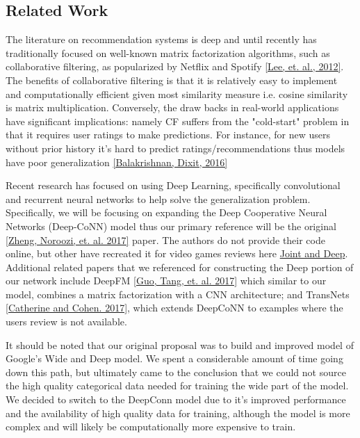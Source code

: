 \documentclass[10pt,twocolumn,letterpaper]{article}
\begin{document}

\subsection{Related Work}
\par The literature on recommendation systems is deep and until recently has traditionally focused on well-known matrix factorization algorithms, such as collaborative filtering, as popularized by Netflix and Spotify \href{https://arxiv.org/pdf/1205.3193.pdf}{[Lee, et. al., 2012]}. The benefits of collaborative filtering is that it is relatively easy to implement and computationally efficient given most similarity measure i.e. cosine similarity is matrix multiplication. Conversely, the draw backs in real-world applications have significant implications: namely CF suffers from the "cold-start" problem in that it requires user ratings to make predictions. For instance, for new users without prior history it's hard to predict ratings/recommendations thus models have poor generalization \href{https://cs224d.stanford.edu/reports/BalakrishnanDixit.pdf}{[Balakrishnan, Dixit, 2016]} 

\par Recent research has focused on using Deep Learning, specifically convolutional and recurrent neural networks to help solve the generalization problem. Specifically, we will be focusing on expanding the Deep Cooperative Neural Networks (Deep-CoNN) model thus our primary reference will be the original \href{https://arxiv.org/pdf/1701.04783.pdf}{[Zheng, Noroozi, et. al. 2017]} paper. The authors do not provide their code online, but other have recreated it for video games reviews here \href{https://www.tensorflow.org/tutorials/wide_and_deep}{Joint and Deep}. Additional related papers that we referenced for constructing the Deep portion of our network include DeepFM \href{https://arxiv.org/pdf/1703.04247.pdf}{[Guo, Tang, et. al. 2017]} which similar to our model, combines a matrix factorization with a CNN architecture; and TransNets \href{https://arxiv.org/pdf/1704.02298.pdf}{[Catherine and Cohen. 2017]}, which extends DeepCoNN to examples where the users review is not available. 

It should be noted that our original proposal was to build and improved model of Google's Wide and Deep model. We spent a considerable amount of time going down this path, but ultimately came to the conclusion that we could not source the high quality categorical data needed for training the wide part of the model. We decided to switch to the DeepConn model due to it's improved performance and the availability of high quality data for training, although the model is more complex and will likely be computationally more expensive to train.
\end{document}
